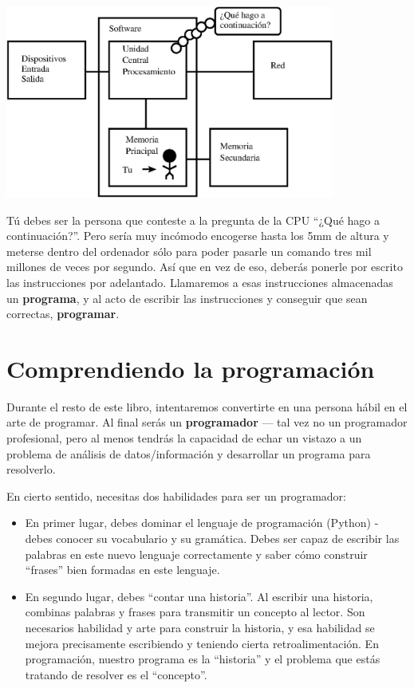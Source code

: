 \beforefig
\centerline{\includegraphics[height=2.50in]{figs2/arch2.eps}}
\afterfig

Tú debes ser la persona que conteste a la pregunta de la CPU ``¿Qué hago a continuación?''.
Pero sería muy incómodo encogerse hasta los 5mm de altura
y meterse dentro del ordenador sólo para poder pasarle un comando
tres mil millones de veces por segundo. Así que en vez de eso,
deberás ponerle por escrito las instrucciones por adelantado.
Llamaremos a esas instrucciones almacenadas un {\bf programa}, y al acto
de escribir las instrucciones y conseguir que
sean correctas, {\bf programar}.

\section{Comprendiendo la programación}

Durante el resto de este libro, intentaremos convertirte en una persona
hábil en el arte de programar. Al final serás un
{\bf programador} --- tal vez no un programador profesional, pero
al menos tendrás la capacidad de echar un vistazo a un problema de análisis
de datos/información y desarrollar un programa para resolverlo.


En cierto sentido, necesitas dos habilidades para ser un programador:

\begin{itemize}

\item En primer lugar, debes dominar el lenguaje de programación (Python) -
debes conocer su vocabulario y su gramática. Debes ser capaz de escribir
las palabras en este nuevo lenguaje correctamente y saber cómo construir
``frases'' bien formadas en este lenguaje.

\item En segundo lugar, debes ``contar una historia''. Al escribir una historia,
combinas palabras y frases para transmitir un concepto al lector.
Son necesarios habilidad y arte para construir la historia, y esa habilidad
se mejora precisamente escribiendo y teniendo cierta retroalimentación.
En programación, nuestro programa es la ``historia'' y el problema
que estás tratando de resolver es el ``concepto''.

\end{itemize}

